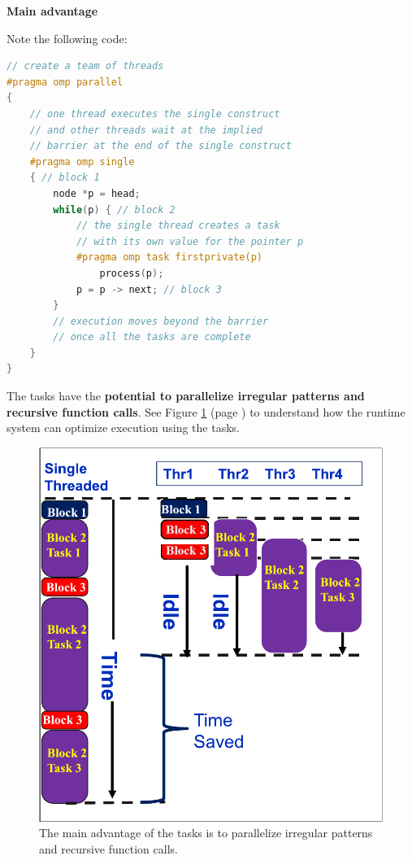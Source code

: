 \begin{flushleft}
    \textcolor{Green3}{ \textbf{Main advantage}}
\end{flushleft}
Note the following code:
\begin{lstlisting}[language=C++]
// create a team of threads
#pragma omp parallel
{
    // one thread executes the single construct
    // and other threads wait at the implied 
    // barrier at the end of the single construct
    #pragma omp single
    { // block 1
        node *p = head;
        while(p) { // block 2
            // the single thread creates a task
            // with its own value for the pointer p
            #pragma omp task firstprivate(p)
                process(p);
            p = p -> next; // block 3
        }
        // execution moves beyond the barrier 
        // once all the tasks are complete
    }
}
\end{lstlisting}
The tasks have the \textbf{potential to parallelize irregular patterns and recursive function calls}. See Figure \ref{figure: openmp tasks 1} (page \pageref{figure: openmp tasks 1}) to understand how the runtime system can optimize execution using the tasks.
\begin{figure}[!htp]
    \centering
    \includegraphics[width=.6\textwidth]{img/openmp-tasks-1.pdf}
    \caption{The main advantage of the tasks is to parallelize irregular patterns and recursive function calls.}
    \label{figure: openmp tasks 1}
\end{figure}

\newpage

